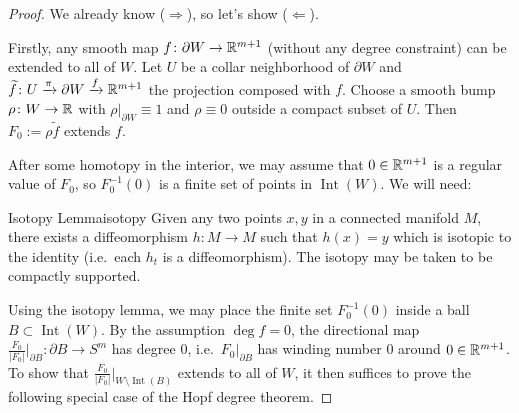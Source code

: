 \begin{proof}
    We already know ($\Rightarrow$), so let's show ($\Leftarrow$).

    Firstly, any smooth map $f \colon \partial W \to \mathbb{R}^{m+1}$ (without any degree constraint) can be extended to all of $W$. Let $U$ be a collar neighborhood of $\partial W$ and $\widetilde{f} \colon U \xrightarrow{\pi} \partial W \xrightarrow{f} \mathbb{R}^{m+1}$ the projection composed with $f$. Choose a smooth bump $\rho \colon W \to \mathbb{R}$ with $\rho|_{\partial W} \equiv 1$ and $\rho \equiv 0$ outside a compact subset of $U$. Then $F_0 := \rho \widetilde{f}$ extends $f$.

    \begin{center}
    \end{center}

    After some homotopy in the interior, we may assume that $0 \in \mathbb{R}^{m+1}$ is a regular value of $F_0$, so $F_0^{-1}(0)$ is a finite set of points in $\operatorname{Int}(W)$. We will need:

    \begin{lemma}{Isotopy Lemma}{isotopy}
        Given any two points $x, y$ in a connected manifold $M$, there exists a diffeomorphism $h \colon M \to M$ such that $h(x) = y$ which is isotopic to the identity (i.e.\ each $h_t$ is a diffeomorphism). The isotopy may be taken to be compactly supported.
    \end{lemma}

    Using the isotopy lemma, we may place the finite set $F_0^{-1}(0)$ inside a ball $B \subset \operatorname{Int}(W)$. By the assumption $\deg f = 0$, the directional map $\frac{F_0}{|F_0|}\big|_{\partial B} \colon \partial B \to S^m$ has degree $0$, i.e.\ $F_0|_{\partial B}$ has winding number $0$ around $0 \in \mathbb{R}^{m+1}$. To show that $\frac{F_0}{|F_0|}\big|_{W \setminus \operatorname{Int}(B)}$ extends to all of $W$, it then suffices to prove the following special case of the Hopf degree theorem.
\end{proof}


